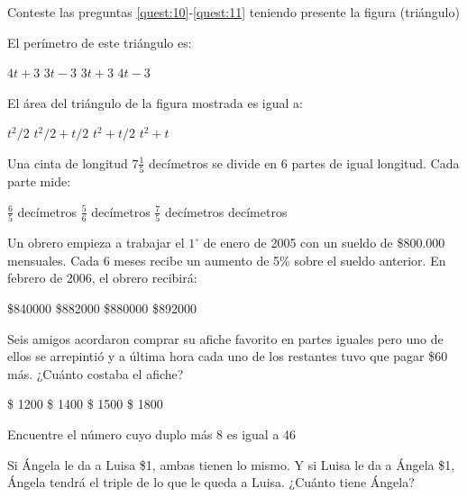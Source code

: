\documentclass[10pt,letterpaper,addpoints]{exam}
\begin{document}
\begin{multicols}{2}
Conteste las preguntas \ref{quest:10}-\ref{quest:11} teniendo presente la figura (tri\'angulo)
\begin{center}
\end{center}
\begin{questions}
\question \label{quest:10} El perímetro de este triángulo es:
\begin{choices}
\choice $4t+3$
\choice $3t-3$
\CorrectChoice $3t+3$
\choice $4t-3$
\end{choices}
\question \label{quest:11}
El \'area del tri\'angulo de la figura mostrada es igual a:
\begin{choices}
\choice $t^{2}/2$
\CorrectChoice $t^{2}/2+t/2$
\choice $t^{2}+t/2$
\choice $t^{2}+t$
\end{choices}
\question
Una cinta de longitud $7\frac{1}{5}$ dec\'imetros se divide en 6 partes de igual longitud. Cada parte mide:
\begin{choices}
\CorrectChoice $\frac{6}{5}$ dec\'imetros
\choice $\frac{5}{6}$ dec\'imetros
\choice $\frac{7}{5}$ dec\'imetros
 dec\'imetros
\end{choices}
\question
Un obrero empieza a trabajar el $1^\circ$ de enero de 2005 con un sueldo de \$800.000 mensuales. Cada 6 meses recibe un aumento de 5\% sobre el sueldo anterior. En febrero de 2006, el obrero recibirá:

\begin{choices}
\choice \$840000
\CorrectChoice \$882000
\choice \$880000
\choice \$892000
\end{choices}
\question Seis amigos acordaron comprar su afiche favorito en partes iguales pero uno de ellos se arrepintió y a última hora cada uno de los restantes tuvo que pagar \$60 más. ¿Cuánto costaba el afiche?
\begin{choices}
\choice \$ 1200
\choice \$ 1400
\choice \$ 1500
\CorrectChoice \$ 1800
\end{choices}
\question Encuentre el número cuyo duplo más 8 es igual a 46

\begin{oneparchoices}
\end{oneparchoices}
\question Si Ángela le da a Luisa \$1, ambas tienen lo mismo. Y si Luisa le da a Ángela \$1, Ángela tendrá el triple de lo que le queda a Luisa. ¿Cuánto tiene Ángela?


\end{questions}
\end{multicols}
\end{document}
